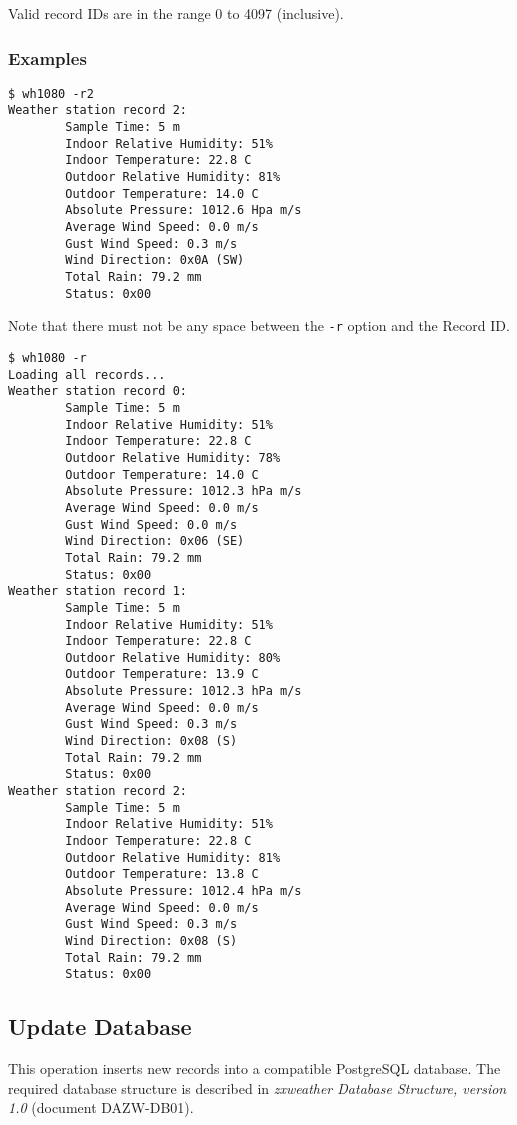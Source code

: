 \documentclass[a4paper,10pt,draft]{book}
\begin{document}
Valid record IDs are in the range 0 to 4097 (inclusive).

\subsubsection{Examples}
\begin{verbatim}
$ wh1080 -r2
Weather station record 2:
        Sample Time: 5 m
        Indoor Relative Humidity: 51%
        Indoor Temperature: 22.8 C
        Outdoor Relative Humidity: 81%
        Outdoor Temperature: 14.0 C
        Absolute Pressure: 1012.6 Hpa m/s
        Average Wind Speed: 0.0 m/s
        Gust Wind Speed: 0.3 m/s
        Wind Direction: 0x0A (SW)
        Total Rain: 79.2 mm
        Status: 0x00
\end{verbatim}
Note that there must not be any space between the \verb|-r| option and the Record ID.

\begin{verbatim}
$ wh1080 -r
Loading all records...
Weather station record 0:
        Sample Time: 5 m
        Indoor Relative Humidity: 51%
        Indoor Temperature: 22.8 C
        Outdoor Relative Humidity: 78%
        Outdoor Temperature: 14.0 C
        Absolute Pressure: 1012.3 hPa m/s
        Average Wind Speed: 0.0 m/s
        Gust Wind Speed: 0.0 m/s
        Wind Direction: 0x06 (SE)
        Total Rain: 79.2 mm
        Status: 0x00
Weather station record 1:
        Sample Time: 5 m
        Indoor Relative Humidity: 51%
        Indoor Temperature: 22.8 C
        Outdoor Relative Humidity: 80%
        Outdoor Temperature: 13.9 C
        Absolute Pressure: 1012.3 hPa m/s
        Average Wind Speed: 0.0 m/s
        Gust Wind Speed: 0.3 m/s
        Wind Direction: 0x08 (S)
        Total Rain: 79.2 mm
        Status: 0x00        
Weather station record 2:
        Sample Time: 5 m
        Indoor Relative Humidity: 51%
        Indoor Temperature: 22.8 C
        Outdoor Relative Humidity: 81%
        Outdoor Temperature: 13.8 C
        Absolute Pressure: 1012.4 hPa m/s
        Average Wind Speed: 0.0 m/s
        Gust Wind Speed: 0.3 m/s
        Wind Direction: 0x08 (S)
        Total Rain: 79.2 mm
        Status: 0x00        
\end{verbatim}

\subsection{Update Database}
This operation inserts new records into a compatible PostgreSQL database. The required database structure is described in \emph{zxweather Database Structure, version 1.0} (document DAZW-DB01).
\end{document}
